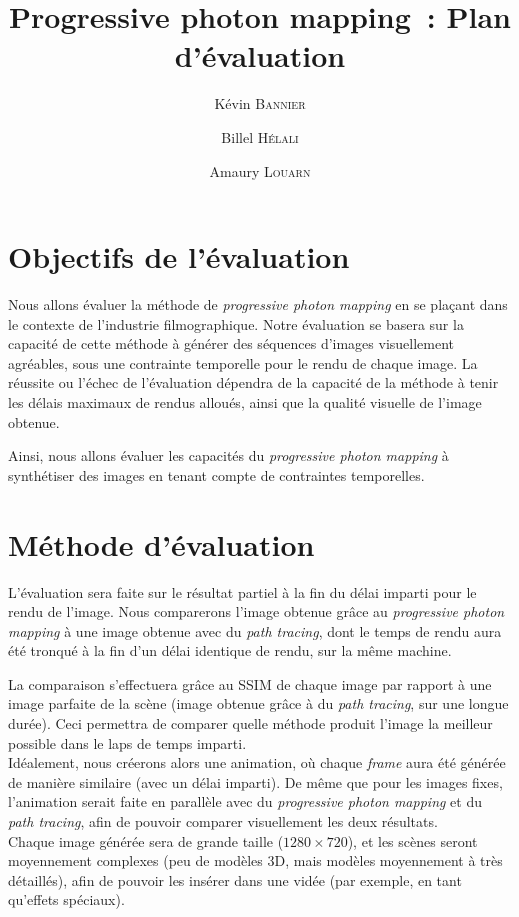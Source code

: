 \documentclass[a4paper]{article}
\title{Progressive photon mapping~: Plan d'évaluation}
\author{Kévin \textsc{Bannier} \and Billel \textsc{Hélali} \and Amaury \textsc{Louarn}}
\begin{document}
\maketitle

\section{Objectifs de l'évaluation}
Nous allons évaluer la méthode de \emph{progressive photon mapping} en se plaçant dans le contexte de l'industrie filmographique. Notre évaluation se basera sur la capacité de cette méthode à générer des séquences d'images visuellement agréables, sous une contrainte temporelle pour le rendu de chaque image. La réussite ou l'échec de l'évaluation dépendra de la capacité de la méthode à tenir les délais maximaux de rendus alloués, ainsi que la qualité visuelle de l'image obtenue.

Ainsi, nous allons évaluer les capacités du \emph{progressive photon mapping} à synthétiser des images en tenant compte de contraintes temporelles.

\section{Méthode d'évaluation}
L'évaluation sera faite sur le résultat partiel à la fin du délai imparti pour le rendu de l'image. Nous comparerons l'image obtenue grâce au \emph{progressive photon mapping} à une image obtenue avec du \emph{path tracing}, dont le temps de rendu aura été tronqué à la fin d'un délai identique de rendu, sur la même machine.

La comparaison s'effectuera grâce au SSIM de chaque image par rapport à une image \og parfaite \fg de la scène (image obtenue grâce à du \emph{path tracing}, sur une longue durée). Ceci permettra de comparer quelle méthode produit l'image la meilleur possible dans le laps de temps imparti.\\

Idéalement, nous créerons alors une animation, où chaque \emph{frame} aura été générée de manière similaire (avec un délai imparti). De même que pour les images fixes, l'animation serait faite en parallèle avec du \emph{progressive photon mapping} et du \emph{path tracing}, afin de pouvoir comparer visuellement les deux résultats.\\

Chaque image générée sera de grande taille ($1280 \times 720$), et les scènes seront moyennement complexes (peu de modèles 3D, mais modèles moyennement à très détaillés), afin de pouvoir les insérer dans une vidée (par exemple, en tant qu'effets spéciaux).
\end{document}
